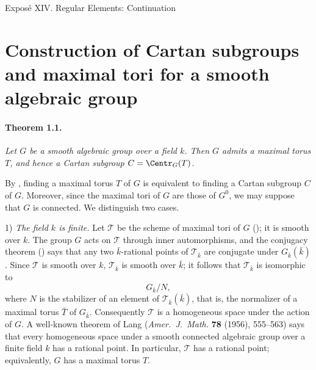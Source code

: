 
  {Exposé XIV. Regular Elements: Continuation}


\setcounter{footnote}{0}

\section{Construction of Cartan subgroups and maximal tori for a
smooth algebraic group}

\paragraph{\textbf{Theorem 1.1.}}
\emph{Let \(G\) be a smooth algebraic group over a field \(k\).
Then \(G\) admits a maximal torus \(T\), and hence a Cartan subgroup
\(C=\Centr_G(T)\).}

By , finding a maximal torus \(T\) of \(G\) is equivalent to
finding a Cartan subgroup \(C\) of \(G\). Moreover, since the maximal
tori of \(G\) are those of \(G^0\), we may suppose that \(G\) is
connected. We distinguish two cases.

\medskip
\noindent\textup{1\textdegree)} \emph{The field \(k\) is finite.}
Let \(\mathcal T\) be the scheme of maximal tori of \(G\)
(); it is smooth over \(k\). The group \(G\) acts on
\(\mathcal T\) through inner automorphisms, and the conjugacy theorem
() says that any two \(\bar k\)-rational points of
\(\mathcal T_{\bar k}\) are conjugate under
\(G_{\bar k}(\bar k)\). Since \(\mathcal T\) is smooth over \(k\),
\(\mathcal T_{\bar k}\) is smooth over \(\bar k\); it follows that
\(\mathcal T_{\bar k}\) is isomorphic to
\[
  G_{\bar k}/N,
\]
where \(N\) is the stabilizer of an element of
\(\mathcal T_{\bar k}(\bar k)\), that is, the normalizer of a
maximal torus \(\bar T\) of \(G_{\bar k}\). Consequently
\(\mathcal T\) is a homogeneous space under the action of \(G\).
A well-known theorem of Lang
(\emph{Amer.\ J.\ Math.} \textbf{78} (1956), 555--563) says that
every homogeneous space under a smooth connected algebraic group
over a finite field \(k\) has a rational point. In particular,
\(\mathcal T\) has a rational point; equivalently, \(G\) has a
maximal torus \(T\).

